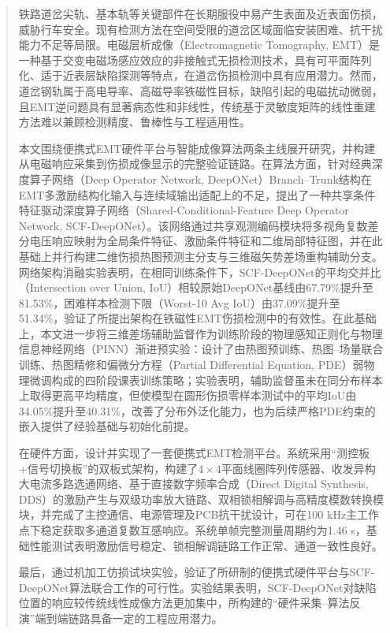 \setlength{\baselineskip}{20pt}
\begin{abstract}
铁路道岔尖轨、基本轨等关键部件在长期服役中易产生表面及近表面伤损，威胁行车安全。现有检测方法在空间受限的道岔区域面临安装困难、抗干扰能力不足等局限。电磁层析成像（Electromagnetic Tomography, EMT）是一种基于交变电磁场感应效应的非接触式无损检测技术，具有可平面阵列化、适于近表层缺陷探测等特点，在道岔伤损检测中具有应用潜力。然而，道岔钢轨属于高电导率、高磁导率铁磁性目标，缺陷引起的电磁扰动微弱，且EMT逆问题具有显著病态性和非线性，传统基于灵敏度矩阵的线性重建方法难以兼顾检测精度、鲁棒性与工程适用性。

本文围绕便携式EMT硬件平台与智能成像算法两条主线展开研究，并构建从电磁响应采集到伤损成像显示的完整验证链路。在算法方面，针对经典深度算子网络（Deep Operator Network, DeepONet）Branch--Trunk结构在EMT多激励结构化输入与连续域输出适配上的不足，提出了一种共享条件特征驱动深度算子网络（Shared-Conditional-Feature Deep Operator Network, SCF-DeepONet）。该网络通过共享观测编码模块将多视角复数差分电压响应映射为全局条件特征、激励条件特征和二维局部特征图，并在此基础上并行构建二维伤损热图预测主分支与三维磁矢势差场重构辅助分支。网络架构消融实验表明，在相同训练条件下，SCF-DeepONet的平均交并比（Intersection over Union, IoU）相较原始DeepONet基线由67.79\%提升至81.53\%，困难样本检测下限（Worst-10 Avg IoU）由37.09\%提升至51.34\%，验证了所提出架构在铁磁性EMT伤损检测中的有效性。在此基础上，本文进一步将三维差场辅助监督作为训练阶段的物理感知正则化与物理信息神经网络（PINN）渐进预实验：设计了由热图预训练、热图--场量联合训练、热图精修和偏微分方程（Partial Differential Equation, PDE）弱物理微调构成的四阶段课表训练策略；实验表明，辅助监督虽未在同分布样本上取得更高平均精度，但使模型在圆形伤损零样本测试中的平均IoU由34.05\%提升至40.31\%，改善了分布外泛化能力，也为后续严格PDE约束的嵌入提供了经验基础与初始化前提。

在硬件方面，设计并实现了一套便携式EMT检测平台。系统采用“测控板+信号切换板”的双板式架构，构建了$4 \times 4$平面线圈阵列传感器、收发异构大电流多路选通网络、基于直接数字频率合成（Direct Digital Synthesis, DDS）的激励产生与双级功率放大链路、双相锁相解调与高精度模数转换模块，并完成了主控通信、电源管理及PCB抗干扰设计，可在100 kHz主工作点下稳定获取多通道复数互感响应。系统单帧完整测量周期约为1.46 s，基础性能测试表明激励信号稳定、锁相解调链路工作正常、通道一致性良好。

最后，通过机加工仿损试块实验，验证了所研制的便携式硬件平台与SCF-DeepONet算法联合工作的可行性。实验结果表明，SCF-DeepONet对缺陷位置的响应较传统线性成像方法更加集中，所构建的“硬件采集--算法反演”端到端链路具备一定的工程应用潜力。
		
\noindent{}
\end{abstract}